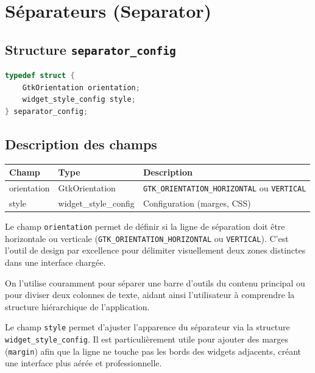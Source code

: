 \section{Séparateurs (Separator)}

\subsection{Structure \texttt{separator\_config}}
\begin{lstlisting}[language=C]
typedef struct {
    GtkOrientation orientation;
    widget_style_config style;
} separator_config;
\end{lstlisting}

\subsection{Description des champs}
\begin{center}
\begin{tabular}{|l|l|>{\raggedright\arraybackslash}p{6cm}|}
\hline
\textbf{Champ} & \textbf{Type} & \textbf{Description} \\
\hline
orientation & GtkOrientation & \texttt{GTK\_ORIENTATION\_HORIZONTAL} ou \texttt{VERTICAL} \\
\hline
style & widget\_style\_config & Configuration (marges, CSS) \\
\hline
\end{tabular}
\end{center}

\bigskip

Le champ \texttt{orientation} permet de définir si la ligne de séparation doit être horizontale ou verticale (\texttt{GTK\_ORIENTATION\_HORIZONTAL} ou \texttt{VERTICAL}). C'est l'outil de design par excellence pour délimiter visuellement deux zones distinctes dans une interface chargée.

On l'utilise couramment pour séparer une barre d'outils du contenu principal ou pour diviser deux colonnes de texte, aidant ainsi l'utilisateur à comprendre la structure hiérarchique de l'application.

Le champ \texttt{style} permet d'ajuster l'apparence du séparateur via la structure \texttt{widget\_style\_config}. Il est particulièrement utile pour ajouter des marges (\texttt{margin}) afin que la ligne ne touche pas les bords des widgets adjacents, créant une interface plus aérée et professionnelle.